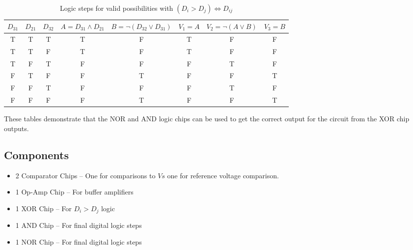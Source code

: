 \documentclass{article}
\begin{document}
%
%

\begin{table}[H]
	\centering
	\caption{Logic steps for valid possibilities with $(D_i > D_j) \iff D_{ij}$}
	\begin{tabular}{ccc|cc|ccc}
		$D_{31}$ & $D_{21}$ & $D_{32}$ & $A = D_{31} \land D_{21}$ & $B = \neg\left(D_{32} \lor D_{31}\right)$ & $V_1 = A$ & $V_2 = \neg(A \lor B)$ & $V_3 = B$ \\\hline
		T & T & T & T & F & T & F & F \\
		T & T & F & T & F & T & F & F \\
		T & F & T & F & F & F & T & F \\
		F & T & F & F & T & F & F & T \\
		F & F & T & F & F & F & T & F \\
		F & F & F & F & T & F & F & T \\
	\end{tabular}
\end{table}
These tables demonstrate that the NOR and AND logic chips can be used to get the correct output for the circuit from the XOR chip outputs.
\subsection{Components}
\begin{itemize}
	\item 2 Comparator Chips -- One for comparisons to $Vs$ one for reference voltage comparison.
	\item 1 Op-Amp Chip -- For buffer amplifiers
	\item 1 XOR Chip -- For $D_i  > D_j$ logic
	\item 1 AND Chip -- For final digital logic steps
	\item 1 NOR Chip -- For final digital logic steps
\end{itemize}
\end{document}
